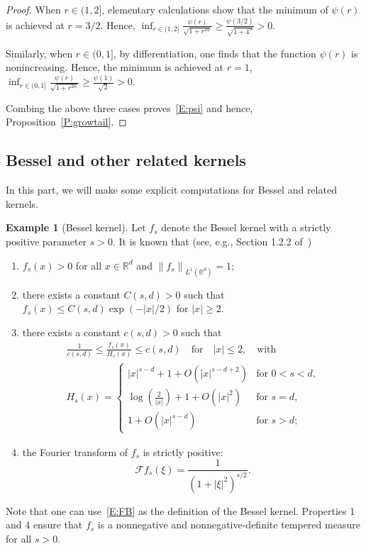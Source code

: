 \documentclass[a4paper,11pt]{article}%
\theoremstyle{plain}
\theoremstyle{definition}
\newtheorem{example}[theorem]{Example}
\numberwithin{equation}{section}
\newcommand{\R}{\mathbb{R}}
\newcommand{\Norm}[1]{\left\| #1 \right\|}
\begin{document}
\begin{proof}
  When $r\in(1,2]$, elementary calculations show that the minimum of $\psi(r)$ is achieved at
  $r = 3/2$. Hence, $\inf_{r\in(1,2]} \frac{\psi(r)}{\sqrt{1+r^{2\alpha}}} \ge \frac{\psi(3/2)
}{\sqrt{1+4^\alpha}}>0$.

  Similarly, when $r\in (0,1]$, by differentiation, one finds that the function $\psi(r)$ is
  nonincreasing. Hence, the minimum is achieved at $r = 1$, $\inf_{r\in(0,1]}
  \frac{\psi(r)}{\sqrt{1+r^{2\alpha}}} \ge \frac{\psi(1)}{\sqrt{2}}>0$.

  Combing the above three cases proves~\eqref{E:psi} and hence, Proposition~\ref{P:growtail}.
\end{proof}

\subsection{Bessel and other related kernels}\label{SS:Bassel}

In this part, we will make some explicit computations for Bessel and related kernels.

\begin{example}[Bessel kernel]\label{Ex:Bessel}
  Let $f_s$ denote the Bessel kernel with a strictly positive parameter $s>0$. It is known that
  (see, e.g., Section 1.2.2 of~\cite{grafakos:14:modern})
  \begin{enumerate}
    \item $f_s(x)>0$ for all $x\in\R^d$ and $ \Norm{f_s}_{L^1 (\R^d)} = 1$;
    \item there exists a constant $C(s,d)>0$ such that $f_s(x) \le C(s,d) \exp(-|x|/2)$ for $|x|\ge
      2$.
    \item there exists a constant $c(s,d)>0$ such that
      \begin{gather*}
        \frac{1}{c(s,d)} \le \frac{f_s(x)}{H_s(x)} \le c(s,d) \quad \text{for} \quad |x| \le 2,
        \quad \text{with} \\
        H_s(x) =
        \begin{cases}
          |x|^{s-d} + 1 + O(|x|^{s-d+2}) & \text{for $0<s<d$,} \\
          \log\left(\frac{2}{|x|}\right) + 1 + O(|x|^{2}) & \text{for $s = d$,} \\
           1 + O(|x|^{s-d}) & \text{for $s>d$;}
        \end{cases}
        \end{gather*}
      \item the Fourier transform of $f_s$ is strictly positive:
        \begin{equation}\label{E:FB}
          \mathcal{F}f_s(\xi) = \frac{1}{(1+|\xi|^2)^{s/2}}.
        \end{equation}
  \end{enumerate}
  Note that one can use~\eqref{E:FB} as the definition of the Bessel kernel. Properties 1 and 4
  ensure that $f_s$ is a nonnegative and nonnegative-definite tempered measure for all $s>0$.
\end{example}
\end{document}
